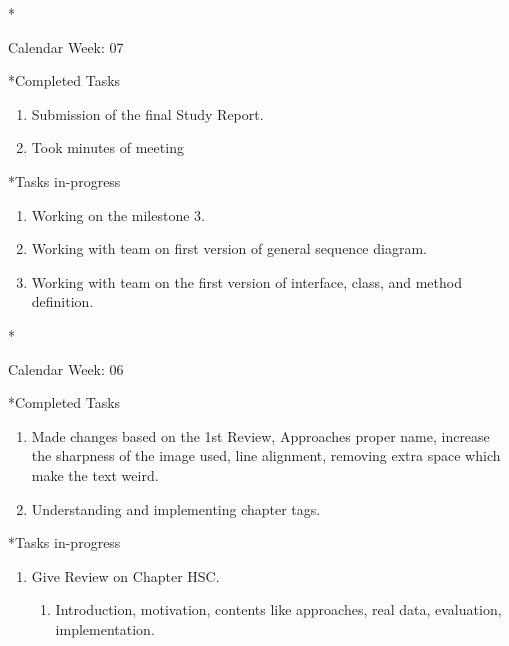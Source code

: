 \documentclass[11pt,a4paper]{article}
\begin{document}
\begin{section}*{Calendar Week: 07 \hfill \date{19 February, 2021}}

    \begin{subsection}*{Completed Tasks}
        \begin{enumerate}
            \item
                Submission of the final Study Report.
            \item 
                Took minutes of meeting
        \end{enumerate}
    \end{subsection}
    
    
    \begin{subsection}*{Tasks in-progress}
        \begin{enumerate}
            \item Working on the milestone 3.
            \item Working with team on first version of general sequence diagram.
            \item Working with team on the first version of interface, class, and method definition.
        \end{enumerate}
    \end{subsection}
\end{section}

\newpage
\begin{section}*{Calendar Week: 06 \hfill \date{12 February, 2021}}

    \begin{subsection}*{Completed Tasks}
        \begin{enumerate}
            \item
                Made changes based on the 1st Review, Approaches proper name, increase the sharpness of the image used, line alignment, removing extra space which make the text weird.
            \item 
                Understanding and implementing chapter tags.
        \end{enumerate}
    \end{subsection}
    
    \begin{subsection}*{Tasks in-progress}
        \begin{enumerate}
            \item Give Review on Chapter HSC.
            \begin{enumerate}
                \item Introduction, motivation, contents like approaches, real data, evaluation, implementation.
            \end{enumerate}
        \end{enumerate}
    \end{subsection}
\end{section}
\end{document}
